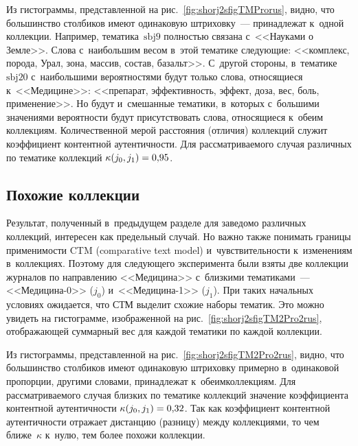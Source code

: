 \begin{multicols}{2}
    Из гистограммы, представленной на рис.~\ref{fig:shorj2sfigTMProrus}, 
видно, что большинство столбиков имеют одинаковую штриховку~--- принадлежат 
к~одной коллекции.
    Например, тематика~$\mathrm{sbj9}$ полностью связана с~<<Науками о Земле>>.
    Слова с~наибольшим весом в~этой тематике следующие:  <<комплекс, порода, 
Урал, зона, массив, состав, базальт>>.
    С~другой стороны, в~тематике~$\mathrm{sbj20}$  с~наибольшими вероятностями будут 
только слова, относящиеся к~<<Медицине>>: <<препарат, эффективность, эффект, 
доза, вес, боль, применение>>.
    Но будут и~смешанные тематики, в~которых с~большими значениями вероятности 
будут присутствовать слова, относящиеся к~обеим коллекциям.
    Количественной мерой расстояния (отличия) коллекций служит коэффициент 
контентной аутентичности.
    Для рассматриваемого случая различных по тематике коллекций $\kappa 
(j_0,j_1) \hm= 0{,}95$.


    
    \subsection{Похожие коллекции}
    
    Результат, полученный в~предыдущем разделе для заведомо различных 
коллекций, интересен как предельный случай.
    Но важно также понимать границы применимости CTM (comparative text model)
    и~чувствительности 
    к~изменениям в~коллекциях.
    Поэтому для следующего эксперимента были взяты две коллекции журналов по 
направлению <<Медицина>> с~близкими тематиками~--- <<Медицина-0>> ($j_0$) 
и~<<Медицина-1>> ($j_1$).
    При таких начальных условиях ожидается, что СТМ выделит схожие наборы 
тематик.
       Это можно увидеть на гистограмме, изоб\-ра\-жен\-ной на 
       рис.~\ref{fig:shorj2sfigTM2Pro2rus}, отображающей суммарный вес для каждой тематики 
по каждой коллекции.
    

    
    Из гистограммы, представленной на рис.~\ref{fig:shorj2sfigTM2Pro2rus}, 
видно, что большинство столбиков имеют оди\-на\-ковую штриховку примерно 
в~одинаковой про\-порции, другими словами, принадлежат к~обеим\linebreak коллекциям.
    Для рассматриваемого случая близких по тематике коллекций значение 
коэффициента контентной аутентичности   $\kappa (j_0,j_1) \hm= 0{,}32$.
    Так как коэффициент контентной аутентичности отражает дистанцию (разницу) 
между коллекциями, то чем ближе~$\kappa$  к~нулю, тем более похожи коллекции.
    

\end{multicols}
